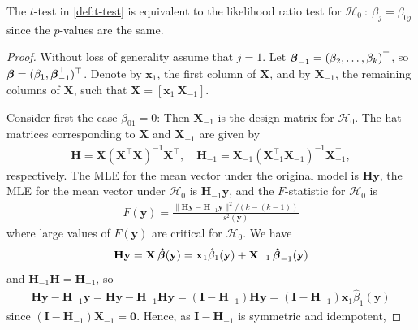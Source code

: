 \begin{theorem}
    The $t$-test in \eqref{def:t-test} is equivalent to the likelihood ratio test for $\mathcal{H}_0 \ : \ \beta_j = \beta_{0j}$ since the $p$-values are the same.
\end{theorem}
\begin{proof}
    Without loss of generality assume that $j = 1$.
    Let $\operatorname{\boldsymbol{\beta}}_{-1} = (\beta_2, \ldots, \beta_k)^\top$, so $\operatorname{\boldsymbol{\beta}} = (\beta_1, \operatorname{\boldsymbol{\beta}}_{-1}^\top)^\top$.
    Denote by $\textbf{x}_1$, the first column of $\textbf{X}$, and by $\textbf{X}_{-1}$, the remaining columns of $\textbf{X}$, such that $\textbf{X} = \left[\textbf{x}_1 \ \textbf{X}_{-1}\right]$.
    
    Consider first the case $\beta_{01} = 0$: Then $\textbf{X}_{-1}$ is the design matrix for $\mathcal{H}_0$.
    The hat matrices corresponding to $\textbf{X}$ and $\textbf{X}_{-1}$ are given by
    \begin{align*}
        \textbf{H} = \textbf{X}(\textbf{X}^\top\textbf{X})^{-1}\textbf{X}^\top, \quad \mathbf{H}_{-1} = \textbf{X}_{-1}(\textbf{X}^\top_{-1}\textbf{X}_{-1})^{-1}\textbf{X}^\top_{-1},
    \end{align*}
    respectively.
    The MLE for the mean vector under the original model is $\textbf{H}\textbf{y}$, the MLE for the mean vector under $\mathcal{H}_0$ is $\textbf{H}_{-1}\textbf{y}$, and the $F$-statistic for $\mathcal{H}_0$ is
    \begin{align*}
        F(\textbf{y}) = \frac{\|\textbf{H}\textbf{y} - \textbf{H}_{-1}\textbf{y}\|^2/(k-(k-1))}{s^2(\textbf{y})}
    \end{align*}
    where large values of $F(\textbf{y})$ are critical for $\mathcal{H}_0$.
    We have
    \begin{align*}
        \textbf{H}\textbf{y} = \textbf{X}\operatorname{\boldsymbol{\hat{\beta}}}(\textbf{y}) = \textbf{x}_1\hat{\beta}_1(\textbf{y}) + \textbf{X}_{-1} \operatorname{\boldsymbol{\hat{\beta}}}_{-1}(\textbf{y})
    \end{align*}
    and $\textbf{H}_{-1}\textbf{H} = \textbf{H}_{-1}$, so
    \begin{align*}
        \textbf{H}\textbf{y}-\textbf{H}_{-1}\textbf{y} = 
        \textbf{H}\textbf{y}-\textbf{H}_{-1}\textbf{H}\textbf{y} =
        (\textbf{I} - \textbf{H}_{-1})\textbf{H}\textbf{y} = 
        (\textbf{I} - \textbf{H}_{-1})\textbf{x}_1\hat{\beta}_1(\textbf{y})
    \end{align*}
    since $(\textbf{I} - \textbf{H}_{-1})\textbf{X}_{-1} = \textbf{0}$.
    Hence, as $\textbf{I} - \textbf{H}_{-1}$ is symmetric and idempotent,

\end{proof}
